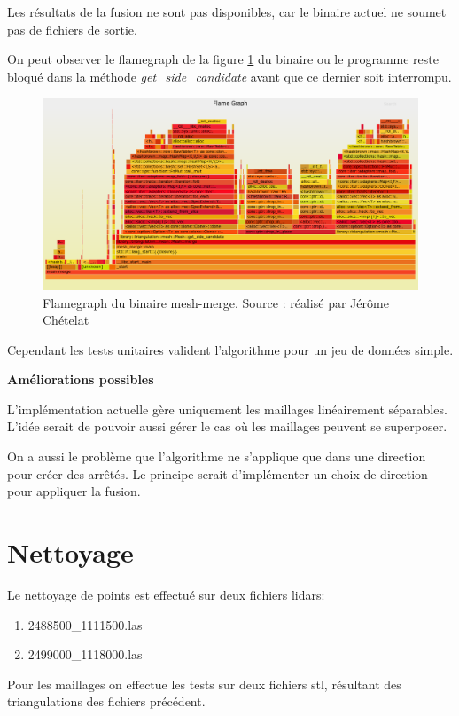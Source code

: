 Les résultats de la fusion ne sont pas disponibles, car le binaire actuel ne
soumet pas de fichiers de sortie.

On peut observer le flamegraph de la figure \ref{fig:flamegraph_mesh_merge}
du binaire ou le programme reste bloqué dans la méthode \textit{get\_side\_candidate}
avant que ce dernier soit interrompu.

\begin{figure}[htbp!]
    \centering
    \includegraphics[width=0.8\linewidth]{figures/merge-debug-flamegraph.png}
    \caption{Flamegraph du binaire mesh-merge. Source : réalisé par Jérôme Chételat}
    \label{fig:flamegraph_mesh_merge}
\end{figure}


Cependant les tests unitaires valident l'algorithme pour un jeu de données simple.

\textbf{Améliorations possibles}

L'implémentation actuelle gère uniquement les maillages linéairement séparables.
L'idée serait de pouvoir aussi gérer le cas où les maillages peuvent se
superposer.

On a aussi le problème que l'algorithme ne s'applique que dans une direction
pour créer des arrêtés. Le principe serait d'implémenter un choix de direction
pour appliquer la fusion.

\section{Nettoyage}

Le nettoyage de points est effectué sur deux fichiers lidars:
\begin{enumerate}
    \item 2488500\_1111500.las
    \item 2499000\_1118000.las
\end{enumerate}

Pour les maillages on effectue les tests sur deux fichiers \gls{stl}, résultant des triangulations des fichiers précédent.

